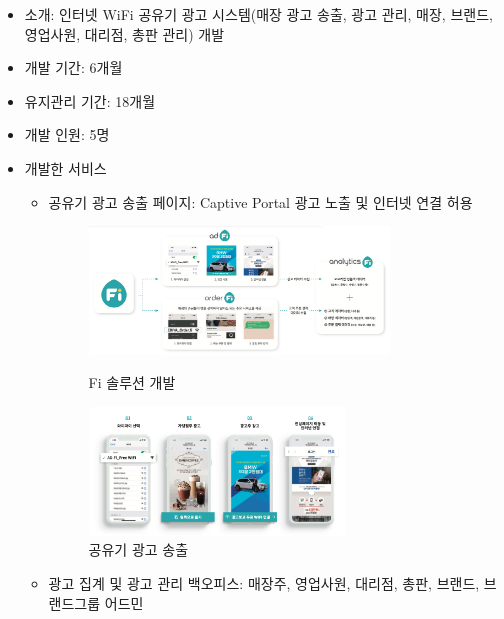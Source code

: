 
\begin{itemize}[label=]
	\item 소개: 인터넷 WiFi 공유기 광고 시스템(매장 광고 송출, 광고 관리, 매장, 브랜드, 영업사원, 대리점, 총판 관리) 개발
	\item 개발 기간: 6개월
	\item 유지관리 기간: 18개월
	\item 개발 인원: 5명
	\item 개발한 서비스
	      \begin{itemize}[label=]
		      \item 공유기 광고 송출 페이지: Captive Portal 광고 노출 및 인터넷 연결 허용
		            \begin{figure}[!ht]
			            \begin{fullwidth}
				            \parbox{0.8\textwidth}{
					            \centering
					            \includegraphics[width=0.8\textwidth]{images/ad-fi-platform.png}
					            \caption*{Fi 솔루션 개발}
				            }\qquad
				            \parbox{0.68\textwidth}{
					            \centering
					            \includegraphics[width=0.68\textwidth]{images/ad-fi.png}
					            \caption*{공유기 광고 송출}
				            }
			            \end{fullwidth}
		            \end{figure}
		      \item 광고 집계 및 광고 관리 백오피스: 매장주, 영업사원, 대리점, 총판, 브랜드, 브랜드그룹 어드민

\end{itemize}
\end{itemize}
